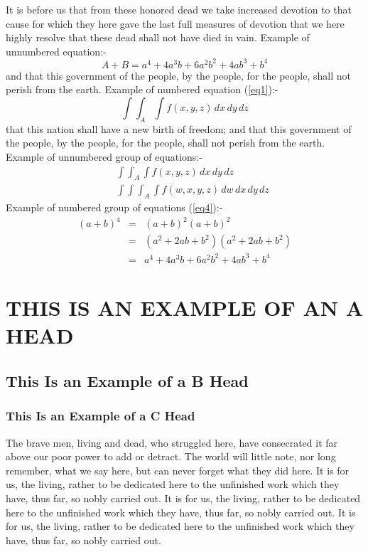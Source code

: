 \documentclass{ar2e}
\begin{document}
It is before us that from these honored dead we take increased
devotion to that cause for which they here gave the last full measures of
devotion  that we here highly resolve that these dead shall not have
died in vain. Example of unnumbered equation:-
\[
        A+B= a^4+4a^3b+6a^2b^2 +4ab^3+b^4
\]
and that this government of the people, by the people, for the
people, shall not perish from the earth.
Example of numbered equation (\ref{eq1}):-
\begin{equation}
\int\int_A\int f(x,y,z)\, dx\,dy\,dz
\label{eq1}
\end{equation}
that this nation shall have a new birth of freedom; and that
this government of the people, by the people, for the people, shall not
perish from the earth. Example of unnumbered group of equations:-
\begin{eqnarray*}
&&{}\int\int_A\int f(x,y,z)\, dx\,dy\,dz\\
&&{}\int\int\int_A\int f(w,x,y,z)\, dw\, dx\,dy\,dz
\end{eqnarray*}
Example of numbered group of equations (\ref{eq4}):-
\begin{eqnarray}
(a+b)^4 &=& (a+b)^2 (a+b)^2\nonumber\\
        &=& (a^2+2ab+b^2) (a^2+2ab+b^2)\nonumber\\
        &=& a^4+4a^3b+6a^2b^2 +4ab^3+b^4
\label{eq4}
\end{eqnarray}

\section{THIS IS AN EXAMPLE OF AN A HEAD}

\subsection{This Is an Example of a B Head}

\subsubsection{This Is an Example of a C Head}

The brave men, living and dead, who struggled
here, have consecrated it far above our poor power to add or detract. The
world will little note, nor long remember, what we say here, but can never
forget what they did here. It is for us, the living, rather to be
dedicated here to the unfinished work which they have, thus far, so nobly
carried out. It is for us, the living, rather to be
dedicated here to the unfinished work which they have, thus far, so nobly
carried out. It is for us, the living, rather to be
dedicated here to the unfinished work which they have, thus far, so nobly
carried out. 
\end{document}
